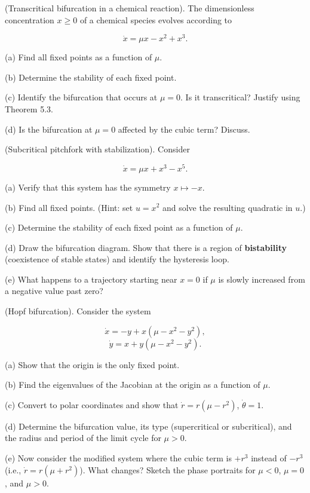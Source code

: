 \begin{exercise}
(Transcritical bifurcation in a chemical reaction). The dimensionless concentration $x \geq 0$ of a chemical species evolves according to

\[
\dot{x} = \mu x - x^2 + x^3.
\]

(a) Find all fixed points as a function of $\mu$.

(b) Determine the stability of each fixed point.

(c) Identify the bifurcation that occurs at $\mu = 0$. Is it transcritical? Justify using Theorem 5.3.

(d) Is the bifurcation at $\mu = 0$ affected by the cubic term? Discuss.


\bigskip

\end{exercise}


\begin{exercise}
(Subcritical pitchfork with stabilization). Consider

\[
\dot{x} = \mu x + x^3 - x^5.
\]

(a) Verify that this system has the symmetry $x \mapsto -x$.

(b) Find all fixed points. (Hint: set $u = x^2$ and solve the resulting quadratic in $u$.)

(c) Determine the stability of each fixed point as a function of $\mu$.

(d) Draw the bifurcation diagram. Show that there is a region of \textbf{bistability} (coexistence of stable states) and identify the hysteresis loop.

(e) What happens to a trajectory starting near $x = 0$ if $\mu$ is slowly increased from a negative value past zero?


\bigskip

\end{exercise}


\begin{exercise}
(Hopf bifurcation). Consider the system

\[
\dot{x} = -y + x(\mu - x^2 - y^2),
\]
\[
\dot{y} = x + y(\mu - x^2 - y^2).
\]

(a) Show that the origin is the only fixed point.

(b) Find the eigenvalues of the Jacobian at the origin as a function of $\mu$.

(c) Convert to polar coordinates and show that $\dot{r} = r(\mu - r^2)$, $\dot{\theta} = 1$.

(d) Determine the bifurcation value, its type (supercritical or subcritical), and the radius and period of the limit cycle for $\mu > 0$.

(e) Now consider the modified system where the cubic term is $+r^3$ instead of $-r^3$ (i.e., $\dot{r} = r(\mu + r^2)$). What changes? Sketch the phase portraits for $\mu < 0$, $\mu = 0$, and $\mu > 0$.


\bigskip

\end{exercise}


